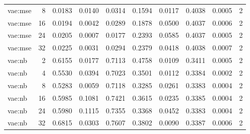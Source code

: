 \begin{tabular}{lrrrrrrrrr}
vae:mse & 8 & 0.0183 & 0.0140 & 0.0314 & 0.1594 & 0.0117 & 0.4038 & 0.0005 & 2 \\
vae:mse & 16 & 0.0194 & 0.0042 & 0.0289 & 0.1878 & 0.0500 & 0.4037 & 0.0006 & 2 \\
vae:mse & 24 & 0.0205 & 0.0007 & 0.0177 & 0.2393 & 0.0585 & 0.4037 & 0.0005 & 2 \\
vae:mse & 32 & 0.0225 & 0.0031 & 0.0294 & 0.2379 & 0.0418 & 0.4038 & 0.0007 & 2 \\
vae:nb & 2 & 0.6155 & 0.0177 & 0.7113 & 0.4758 & 0.0109 & 0.3411 & 0.0005 & 2 \\
vae:nb & 4 & 0.5530 & 0.0394 & 0.7023 & 0.3501 & 0.0112 & 0.3384 & 0.0002 & 2 \\
vae:nb & 8 & 0.5283 & 0.0059 & 0.7118 & 0.3285 & 0.0261 & 0.3383 & 0.0004 & 2 \\
vae:nb & 16 & 0.5985 & 0.1081 & 0.7421 & 0.3615 & 0.0235 & 0.3385 & 0.0004 & 2 \\
vae:nb & 24 & 0.5980 & 0.1115 & 0.7355 & 0.3368 & 0.0452 & 0.3383 & 0.0004 & 2 \\
vae:nb & 32 & 0.6815 & 0.0303 & 0.7607 & 0.3802 & 0.0090 & 0.3387 & 0.0006 & 2 \\
\bottomrule
\end{tabular}
